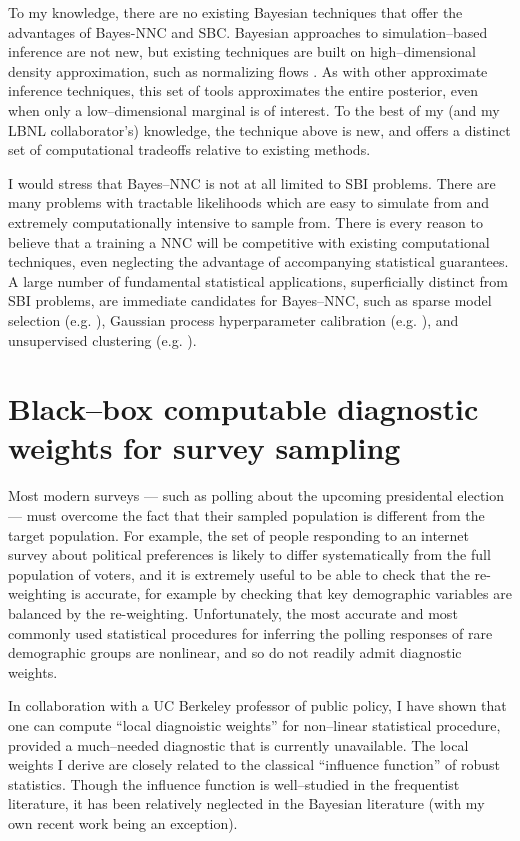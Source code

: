 To my knowledge, there are no existing Bayesian techniques that offer the
advantages of Bayes-NNC and SBC.  Bayesian approaches to simulation--based
inference are not new, but existing techniques are built on high--dimensional
density approximation, such as normalizing flows
\citep{cranmer:2020:frontierofsimulation}.  As with other approximate inference
techniques, this set of tools approximates the entire posterior, even when only
a low--dimensional marginal is of interest.  To the best of my (and my LBNL
collaborator's) knowledge, the technique above is new, and offers a distinct set
of computational tradeoffs relative to existing methods.  

I would stress that Bayes--NNC is not at all limited to SBI problems. There are
many problems with tractable likelihoods which are easy to simulate from and
extremely computationally intensive to sample from.  There is every reason to
believe that a training a NNC will be competitive with existing computational
techniques, even neglecting the advantage of accompanying statistical
guarantees.  A large number of fundamental statistical applications,
superficially distinct from SBI problems, are immediate candidates for
Bayes--NNC, such as sparse model selection (e.g.
\citep{rovckova:2018:spikeandslablasso}), Gaussian process hyperparameter
calibration (e.g. \citep{hensman:2015:gpclassificationscalable}), and
unsupervised clustering (e.g. \citet{mcauliffe:2006:dpeb}).



\section*{Black--box computable diagnostic weights for survey sampling}

Most modern surveys --- such as polling about the upcoming presidental election
--- must overcome the fact that their sampled population is different from the
target population.  For example, the set of people responding to an internet
survey about political preferences is likely to differ systematically from the
full population of voters, and it is extremely useful to be able to check that
the re-weighting is accurate, for example by checking that key demographic
variables are balanced by the re-weighting.  Unfortunately, the most accurate
and most commonly used statistical procedures for inferring the polling
responses of rare demographic groups are nonlinear, and so do not readily admit
diagnostic weights. 

In collaboration with a UC Berkeley professor of public policy, I have shown
that one can compute ``local diagnoistic weights'' for non--linear statistical
procedure, provided a much--needed diagnostic that is currently unavailable. The
local weights I derive are closely related to the classical ``influence
function'' of robust statistics.  Though the influence function is well--studied
in the frequentist literature, it has been relatively neglected in the Bayesian
literature (with my own recent work being an exception).

